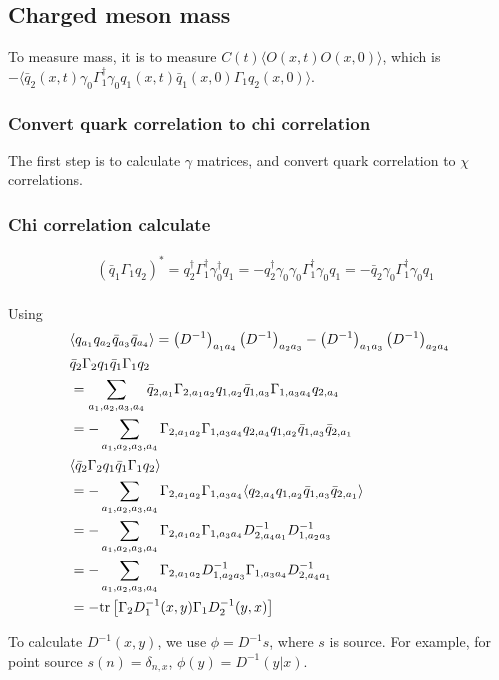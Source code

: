 \subsection{\label{sec:ChargedMesonMass}Charged meson mass}

To measure mass, it is to measure $C(t)\langle O(x,t)O(x,0) \rangle$, which is $-\langle \bar{q}_2(x,t) \gamma _0\Gamma _1^{\dagger}\gamma _0 q_1(x,t)\bar{q}_1(x,0)\Gamma _1 q_2(x,0) \rangle$.


\subsubsection{\label{sec:ConvertQuarkCorrelationToChi}Convert quark correlation to chi correlation}

The first step is to calculate $\gamma $ matrices, and convert quark correlation to $\chi$ correlations.


\subsubsection{\label{sec:ChiCorrelationCalculate}Chi correlation calculate}

\begin{equation}
\begin{split}
&\left(\bar{q}_1\Gamma _1 q_2\right)^* = q_2^{\dagger}\Gamma _1^{\dagger} \gamma _0^{\dagger} q_1=-q_2^{\dagger}\gamma _0\gamma _0\Gamma _1^{\dagger} \gamma _0 q_1=-\bar{q}_2 \gamma _0\Gamma _1^{\dagger} \gamma _0 q_1\\
\end{split}
\end{equation}

Using
\begin{equation}
\begin{split}
&\langle q_{a_1}q_{a_2}\bar{q}_{a_3}\bar{q}_{a_4} \rangle = \left(D^{-1}\right)_{a_1a_4}\left(D^{-1}\right)_{a_2a_3}-\left(D^{-1}\right)_{a_1a_3}\left(D^{-1}\right)_{a_2a_4}\\
&\bar{q}_2 \Gamma _2 q_1 \bar{q}_1 \Gamma _1 q_2\\
&=\sum _{a_1,a_2,a_3,a_4} \bar{q}_{2,a_1} \Gamma _{2,a_1a_2} q_{1,a_2} \bar{q}_{1,a_3} \Gamma _{1,a_3a_4} q_{2,a_4}\\
&=-\sum _{a_1,a_2,a_3,a_4}  \Gamma _{2,a_1a_2}\Gamma _{1,a_3a_4} q_{2,a_4} q_{1,a_2} \bar{q}_{1,a_3}  \bar{q}_{2,a_1}\\
&\langle \bar{q}_2 \Gamma _2 q_1 \bar{q}_1 \Gamma _1 q_2 \rangle\\
&=-\sum _{a_1,a_2,a_3,a_4}  \Gamma _{2,a_1a_2}\Gamma _{1,a_3a_4} \langle  q_{2,a_4} q_{1,a_2} \bar{q}_{1,a_3}  \bar{q}_{2,a_1} \rangle\\
&=-\sum _{a_1,a_2,a_3,a_4}  \Gamma _{2,a_1a_2}\Gamma _{1,a_3a_4} D^{-1}_{2,a_4a_1} D^{-1}_{1,a_2a_3}\\
&=-\sum _{a_1,a_2,a_3,a_4}  \Gamma _{2,a_1a_2}D^{-1}_{1,a_2a_3}\Gamma _{1,a_3a_4} D^{-1}_{2,a_4a_1} \\
&=-{\rm tr}\left[\Gamma _2 D^{-1}_1 (x,y)\Gamma _1 D^{-1}_2(y,x)\right]\\
\end{split}
\end{equation}

To calculate $D^{-1}(x,y)$, we use $\phi = D^{-1}s$, where $s$ is source.
For example, for point source $s(n)=\delta _{n,x}$, $\phi(y)=D^{-1}(y|x)$.



